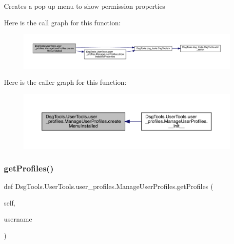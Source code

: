 \begin{DoxyVerb}Creates a pop up menu to show permission properties
\end{DoxyVerb}
 Here is the call graph for this function\+:
\nopagebreak
\begin{figure}[H]
\begin{center}
\leavevmode
\includegraphics[width=350pt]{class_dsg_tools_1_1_user_tools_1_1user__profiles_1_1_manage_user_profiles_a65349a082dd0ecd96d12504f393b9157_cgraph}
\end{center}
\end{figure}
Here is the caller graph for this function\+:
\nopagebreak
\begin{figure}[H]
\begin{center}
\leavevmode
\includegraphics[width=350pt]{class_dsg_tools_1_1_user_tools_1_1user__profiles_1_1_manage_user_profiles_a65349a082dd0ecd96d12504f393b9157_icgraph}
\end{center}
\end{figure}
\mbox{\label{class_dsg_tools_1_1_user_tools_1_1user__profiles_1_1_manage_user_profiles_a7a13c12726e9d7a6cb5d4692ab812be0}} 
\subsubsection{\texorpdfstring{get\+Profiles()}{getProfiles()}}
{\footnotesize\ttfamily def Dsg\+Tools.\+User\+Tools.\+user\+\_\+profiles.\+Manage\+User\+Profiles.\+get\+Profiles (\begin{DoxyParamCaption}\item[{}]{self,  }\item[{}]{username }\end{DoxyParamCaption})}

